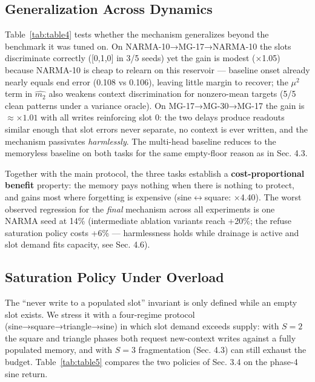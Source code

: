 \documentclass[11pt]{article}
\begin{document}
\subsection{Generalization Across Dynamics}\label{generalization-across-dynamics}

\begin{table}[t]
\centering\small
\caption{F3-onset NMSE on cross-family dynamics; MultiHead equals the
baseline to printed precision.}
\label{tab:table4}

\end{table}

Table~\ref{tab:table4} tests whether the mechanism generalizes beyond the benchmark it
was tuned on. On NARMA-10→MG-17→NARMA-10 the slots discriminate
correctly ({[}0,1,0{]} in 3/5 seeds) yet the gain is modest (×1.05) because
NARMA-10 is cheap to relearn on this reservoir --- baseline onset already
nearly equals end error (0.108 vs 0.106), leaving little margin to
recover; the \(\mu^2\) term in \(\widehat{m_2}\) also weakens context
discrimination for nonzero-mean targets (5/5 clean patterns under a
variance oracle). On MG-17→MG-30→MG-17 the gain is \(\approx\times 1.01\) with all
writes reinforcing slot 0: the two delays produce readouts similar
enough that slot errors never separate, no context is ever written, and
the mechanism passivates \emph{harmlessly}. The multi-head baseline reduces
to the memoryless baseline on both tasks for the same empty-floor
reason as in Sec. 4.3.

Together with the main protocol, the three tasks establish a
\textbf{cost-proportional benefit} property: the memory pays nothing when
there is nothing to protect, and gains most where forgetting is
expensive (sine\(\leftrightarrow\)square: ×4.40). The worst observed regression for
the \emph{final} mechanism across all experiments is one NARMA seed at 14\%
(intermediate ablation variants reach +20\%; the refuse saturation
policy costs +6\% --- harmlessness holds while drainage is active and
slot demand fits capacity, see Sec. 4.6).

\subsection{Saturation Policy Under Overload}\label{saturation-policy-under-overload}

The ``never write to a populated slot'' invariant is only defined while
an empty slot exists. We stress it with a four-regime protocol
(sine→square→triangle→sine) in which slot demand exceeds supply: with
\(S{=}2\) the square and triangle phases both request new-context
writes against a fully populated memory, and with \(S{=}3\)
fragmentation (Sec. 4.3) can still exhaust the budget. Table~\ref{tab:table5}
compares the two policies of Sec. 3.4 on the phase-4 sine return.
\end{document}

